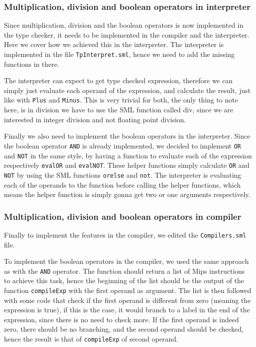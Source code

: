 \documentclass[10pt]{article}
\begin{document}
\subsubsection{Multiplication, division and boolean operators in interpreter}
Since multiplication, division and the boolean operators is now implemented in the type checker, it needs to be implemented in the compiler and the interpreter. Here we cover how we achieved this in the interpreter. The interpreter is implemented in the file \texttt{TpInterpret.sml}, hence we need to add the missing functions in there.

The interpreter can expect to get type checked expression, therefore we can simply just evaluate each operand of the expression, and calculate the result, just like with \texttt{Plus} and \texttt{Minus}. This is very trivial for both, the only thing to note here, is in division we have to use the SML function called div, since we are interested in integer division and not floating point division.

Finally we also need to implement the boolean operators in the interpreter. Since the boolean operator \texttt{AND} is already implemented, we decided to implement \texttt{OR} and \texttt{NOT} in the same style, by having a function to evaluate each of the expression respectively \texttt{evalOR} and \texttt{evalNOT}. These helper functions simply calculate \texttt{OR} and \texttt{NOT} by using the SML functions \texttt{orelse} and \texttt{not}. The interpreter is evaluating each of the operands to the function before calling the helper functions, which means the helper function is simply gonna get two or one arguments respectively.

\subsubsection{Multiplication, division and boolean operators in compiler}
Finally to implement the features in the compiler, we edited the \texttt{Compilers.sml} file.

To implement the boolean operators in the compiler, we used the same approach as with the \texttt{AND} operator. The function should return a list of Mips instructions to achieve this task, hence the beginning of the list should be the output of the function \texttt{compileExp} with the first operand as argument. The list is then followed with some code that check if the first operand is different from zero (meaning the expression is true), if this is the case, it would branch to a label in the end of the expression, since there is no need to check more. If the first operand is indeed zero, there should be no branching, and the second operand should be checked, hence the result is that of \texttt{compileExp} of second operand.
\end{document}
